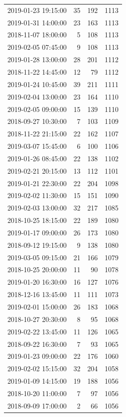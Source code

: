 \begin{tabular}{lrrr}
2019-01-23 19:15:00 & 35 & 192 & 1113 \\
2019-01-31 14:00:00 & 23 & 163 & 1113 \\
2018-11-07 18:00:00 & 5 & 108 & 1113 \\
2019-02-05 07:45:00 & 9 & 108 & 1113 \\
2019-01-28 13:00:00 & 28 & 201 & 1112 \\
2018-11-22 14:45:00 & 12 & 79 & 1112 \\
2019-01-24 10:45:00 & 39 & 211 & 1111 \\
2019-02-04 13:00:00 & 23 & 164 & 1110 \\
2019-02-05 09:00:00 & 15 & 139 & 1110 \\
2018-09-27 10:30:00 & 7 & 103 & 1109 \\
2018-11-22 21:15:00 & 22 & 162 & 1107 \\
2019-03-07 15:45:00 & 6 & 100 & 1106 \\
2019-01-26 08:45:00 & 22 & 138 & 1102 \\
2019-02-21 20:15:00 & 13 & 112 & 1101 \\
2019-01-21 22:30:00 & 22 & 204 & 1098 \\
2019-02-02 11:30:00 & 15 & 151 & 1090 \\
2019-02-03 13:00:00 & 32 & 217 & 1085 \\
2018-10-25 18:15:00 & 22 & 189 & 1080 \\
2019-01-17 09:00:00 & 26 & 173 & 1080 \\
2018-09-12 19:15:00 & 9 & 138 & 1080 \\
2019-03-05 09:15:00 & 21 & 166 & 1079 \\
2018-10-25 20:00:00 & 11 & 90 & 1078 \\
2019-01-20 16:30:00 & 16 & 127 & 1076 \\
2018-12-16 13:45:00 & 11 & 111 & 1073 \\
2019-02-01 15:00:00 & 26 & 183 & 1068 \\
2018-10-27 20:30:00 & 8 & 95 & 1068 \\
2019-02-22 13:45:00 & 11 & 126 & 1065 \\
2018-09-22 16:30:00 & 7 & 93 & 1065 \\
2019-01-23 09:00:00 & 22 & 176 & 1060 \\
2019-02-02 15:15:00 & 32 & 204 & 1058 \\
2019-01-09 14:15:00 & 19 & 188 & 1056 \\
2018-10-20 11:00:00 & 7 & 97 & 1056 \\
2018-09-09 17:00:00 & 2 & 66 & 1056 \\

\end{tabular}
